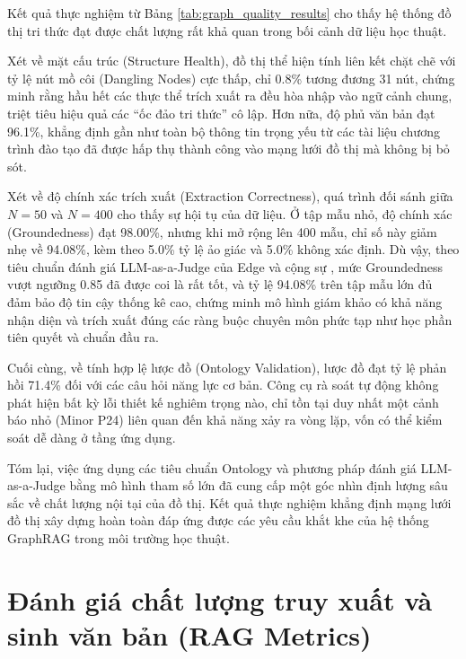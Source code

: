Kết quả thực nghiệm từ Bảng \ref{tab:graph_quality_results} cho thấy hệ thống đồ thị tri thức đạt được chất lượng rất khả quan trong bối cảnh dữ liệu học thuật.

Xét về mặt cấu trúc (Structure Health), đồ thị thể hiện tính liên kết chặt chẽ với tỷ lệ nút mồ côi (Dangling Nodes) cực thấp, chỉ 0.8\% tương đương 31 nút, chứng minh rằng hầu hết các thực thể trích xuất ra đều hòa nhập vào ngữ cảnh chung, triệt tiêu hiệu quả các ``ốc đảo tri thức'' cô lập. Hơn nữa, độ phủ văn bản đạt 96.1\%, khẳng định gần như toàn bộ thông tin trọng yếu từ các tài liệu chương trình đào tạo đã được hấp thụ thành công vào mạng lưới đồ thị mà không bị bỏ sót.

Xét về độ chính xác trích xuất (Extraction Correctness), quá trình đối sánh giữa $N=50$ và $N=400$ cho thấy sự hội tụ của dữ liệu. Ở tập mẫu nhỏ, độ chính xác (Groundedness) đạt 98.00\%, nhưng khi mở rộng lên 400 mẫu, chỉ số này giảm nhẹ về 94.08\%, kèm theo 5.0\% tỷ lệ ảo giác và 5.0\% không xác định. Dù vậy, theo tiêu chuẩn đánh giá LLM-as-a-Judge của Edge và cộng sự \cite{edge2024}, mức Groundedness vượt ngưỡng 0.85 đã được coi là rất tốt, và tỷ lệ 94.08\% trên tập mẫu lớn đủ đảm bảo độ tin cậy thống kê cao, chứng minh mô hình giám khảo có khả năng nhận diện và trích xuất đúng các ràng buộc chuyên môn phức tạp như học phần tiên quyết và chuẩn đầu ra.

Cuối cùng, về tính hợp lệ lược đồ (Ontology Validation), lược đồ đạt tỷ lệ phản hồi 71.4\% đối với các câu hỏi năng lực cơ bản. Công cụ rà soát tự động không phát hiện bất kỳ lỗi thiết kế nghiêm trọng nào, chỉ tồn tại duy nhất một cảnh báo nhỏ (Minor P24) liên quan đến khả năng xảy ra vòng lặp, vốn có thể kiểm soát dễ dàng ở tầng ứng dụng.

Tóm lại, việc ứng dụng các tiêu chuẩn Ontology và phương pháp đánh giá LLM-as-a-Judge bằng mô hình tham số lớn đã cung cấp một góc nhìn định lượng sâu sắc về chất lượng nội tại của đồ thị. Kết quả thực nghiệm khẳng định mạng lưới đồ thị xây dựng hoàn toàn đáp ứng được các yêu cầu khắt khe của hệ thống GraphRAG trong môi trường học thuật.

\section{Đánh giá chất lượng truy xuất và sinh văn bản (RAG Metrics)}
\label{sec:rag_metrics}

